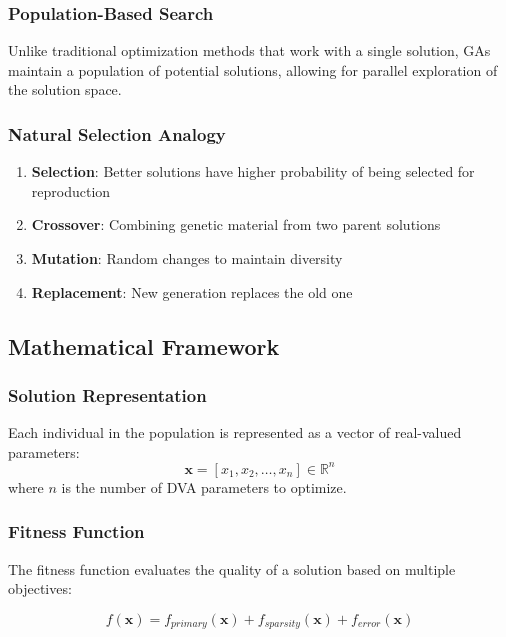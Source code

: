 \documentclass[12pt,a4paper]{article}
\begin{document}
\subsubsection{Population-Based Search}
Unlike traditional optimization methods that work with a single solution, GAs maintain a population of potential solutions, allowing for parallel exploration of the solution space.

\subsubsection{Natural Selection Analogy}
\begin{enumerate}
    \item \textbf{Selection}: Better solutions have higher probability of being selected for reproduction
    \item \textbf{Crossover}: Combining genetic material from two parent solutions
    \item \textbf{Mutation}: Random changes to maintain diversity
    \item \textbf{Replacement}: New generation replaces the old one
\end{enumerate}

\subsection{Mathematical Framework}

\subsubsection{Solution Representation}
Each individual in the population is represented as a vector of real-valued parameters:
\begin{equation}
    \mathbf{x} = [x_1, x_2, \ldots, x_n] \in \mathbb{R}^n
\end{equation}
where $n$ is the number of DVA parameters to optimize.

\subsubsection{Fitness Function}
The fitness function evaluates the quality of a solution based on multiple objectives:

\begin{equation}
    f(\mathbf{x}) = f_{primary}(\mathbf{x}) + f_{sparsity}(\mathbf{x}) + f_{error}(\mathbf{x})
\end{equation}
\end{document}
